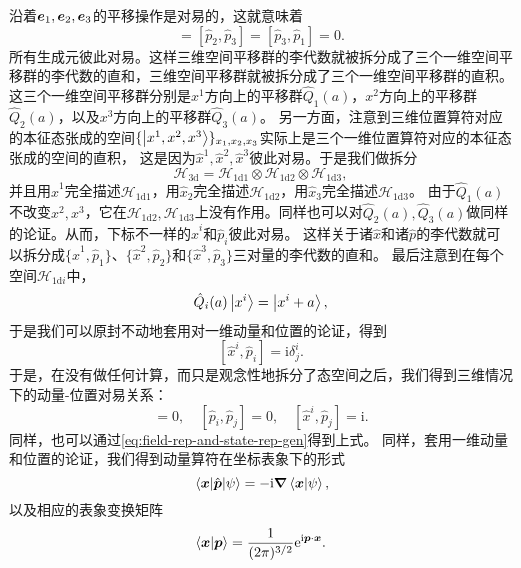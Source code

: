 \documentclass[hyperref, UTF8, a4paper]{ctexart}
\newcommand*{\ii}{\mathrm{i}}
\newcommand*{\ee}{\mathrm{e}}
\begin{document}
沿着$\vb*{e}_1, \vb*{e}_2, \vb*{e}_3$的平移操作是对易的，这就意味着
\begin{equation}
    [\hat{p}_1, \hat{p}_2] = [\hat{p}_2, \hat{p}_3] = [\hat{p}_3, \hat{p}_1] = 0.
\end{equation}
所有生成元彼此对易。这样三维空间平移群的李代数就被拆分成了三个一维空间平移群的李代数的直和，三维空间平移群就被拆分成了三个一维空间平移群的直积。
这三个一维空间平移群分别是$x^1$方向上的平移群$\hat{Q}_1(a)$，$x^2$方向上的平移群$\hat{Q}_2(a)$，以及$x^3$方向上的平移群$\hat{Q}_3(a)$。
另一方面，注意到三维位置算符对应的本征态张成的空间$\{ \ket{x^1, x^2, x^3} \}_{x_1,x_2,x_3}$实际上是三个一维位置算符对应的本征态张成的空间的直积，
这是因为$\hat{x}^1, \hat{x}^2, \hat{x}^3$彼此对易。于是我们做拆分
\[
    \mathcal{H}_\text{3d} = \mathcal{H}_\text{1d1} \otimes \mathcal{H}_\text{1d2} \otimes \mathcal{H}_\text{1d3},
\]
并且用$\hat{x}^1$完全描述$\mathcal{H}_\text{1d1}$，用$\hat{x}_2$完全描述$\mathcal{H}_\text{1d2}$，用$\hat{x}_3$完全描述$\mathcal{H}_\text{1d3}$。
由于$\hat{Q}_1(a)$不改变$x^2, x^3$，它在$\mathcal{H}_\text{1d2},\mathcal{H}_\text{1d3}$上没有作用。同样也可以对$\hat{Q}_2(a),\hat{Q}_3(a)$做同样的论证。从而，下标不一样的$\hat{x}^i$和$\hat{p}_i$彼此对易。
这样关于诸$\hat{x}$和诸$\hat{p}$的李代数就可以拆分成$\{\hat{x}^1, \hat{p}_1\}$、$\{\hat{x}^2, \hat{p}_2\}$和$\{\hat{x}^3, \hat{p}_3\}$三对量的李代数的直和。
最后注意到在每个空间$\mathcal{H}_\text{1d$i$}$中，
\[
    \hat{Q}_i(a) \ket{x^i} = \ket{x^i + a},
\]
于是我们可以原封不动地套用对一维动量和位置的论证，得到
\[
    [\hat{x}^i, \hat{p}_i] = \ii \delta_{j}^i.
\]
于是，在没有做任何计算，而只是观念性地拆分了态空间之后，我们得到三维情况下的动量-位置对易关系：
\begin{equation}
    [\hat{x}^i, \hat{x}^j] = 0, \quad [\hat{p}_i, \hat{p}_j] = 0, \quad [\hat{x}^i, \hat{p}_j] = \ii .
\end{equation}
同样，也可以通过\eqref{eq:field-rep-and-state-rep-gen}得到上式。
同样，套用一维动量和位置的论证，我们得到动量算符在坐标表象下的形式
\begin{equation}
    \mel{\vb*{x}}{\hat{\vb*{p}}}{\psi} = - \ii \grad{\braket{\vb*{x}}{\psi}},
    \label{eq:p-in-x-representation}
\end{equation}
以及相应的表象变换矩阵
\begin{equation}
    \braket{\vb*{x}}{\vb*{p}} = \frac{1}{(2\pi)^{3/2}} \ee^{\ii \vb*{p} \cdot \vb*{x}}.
    \label{eq:x-p-trans}
\end{equation}
\end{document}
